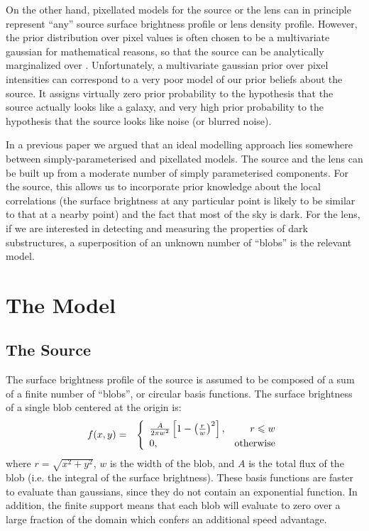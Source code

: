 \documentclass[useAMS,usenatbib]{mn2e}
\begin{document}
On the
other hand, pixellated models for the source \citep[e.g.][]{suyu} or the lens
\citep[e.g.][]{2014MNRAS.445.2181C} can in principle represent ``any''
source surface brightness profile or lens density profile. However, the prior
distribution over pixel values is often chosen to be a multivariate gaussian
for mathematical reasons, so
that the source can be analytically marginalized over
\citep{2003ApJ...590..673W}. Unfortunately, a multivariate gaussian prior
over pixel intensities can correspond to a very poor model of our prior
beliefs about the source. It assigns virtually zero prior probability
to the hypothesis that the source actually looks like a galaxy, and very high
prior probability to the hypothesis that the source looks like noise (or
blurred noise).

In a previous paper \citep{2011MNRAS.412.2521B} we argued that an ideal
modelling approach lies somewhere between simply-parameterised and
pixellated models. The source and the lens can be built up from a moderate
number of simply parameterised components. For the source, this allows
us to incorporate prior knowledge about the local correlations (the surface
brightness at any particular point is likely to be similar to that at a
nearby point) and the fact that most of the sky is dark. For the lens, if
we are interested in detecting and measuring the properties of dark
substructures, a superposition of an unknown number of ``blobs'' is the
relevant model.


\section{The Model}

\subsection{The Source}
The surface brightness profile of the source is assumed to be composed of
a sum of a finite number of ``blobs'', or circular basis functions.
The surface brightness of a single blob centered at the origin
is:
\begin{eqnarray}
f(x, y) &=& \left\{
\begin{array}{lr}
\frac{A}{2\pi w^2}\left[1 - \left(\frac{r}{w}\right)^2\right], & r \leq w\\
0, & \textnormal{otherwise}
\end{array}
\right.
\end{eqnarray}
where $r = \sqrt{x^2 + y^2}$, $w$ is the width of the blob, and $A$ is the
total flux of the blob (i.e. the integral of the surface brightness).
These basis functions are faster to evaluate than gaussians, since they do not
contain an exponential function. In addition, the finite support means that
each blob will evaluate to zero over a large fraction of the domain which
confers an additional speed advantage.
\end{document}
